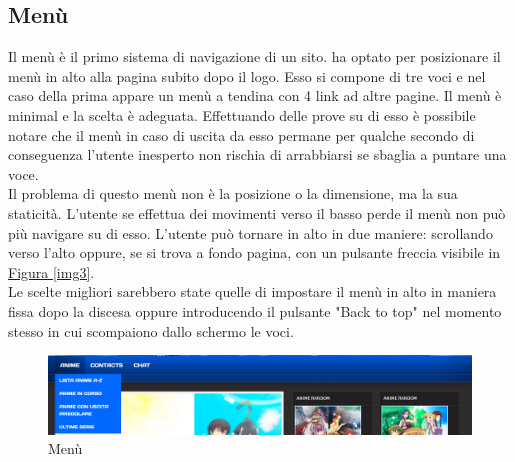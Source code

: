 \subsection{Menù} \label{Menù}
Il menù è il primo sistema di navigazione di un sito. \nomeSito ha optato per posizionare il menù in alto alla pagina subito dopo il logo. Esso si compone di tre voci e nel caso della prima appare un menù a tendina con 4 link ad altre pagine. Il menù è minimal e la scelta è adeguata. Effettuando delle prove su di esso è possibile notare che il menù in caso di uscita da esso permane per qualche secondo di conseguenza l'utente inesperto non rischia di arrabbiarsi se sbaglia a puntare una voce. \\
Il problema di questo menù non è la posizione o la dimensione, ma la sua staticità. L'utente se effettua dei movimenti verso il basso perde il menù non può più navigare su di esso. L'utente può tornare in alto in due maniere: scrollando verso l'alto oppure, se si trova a fondo pagina, con un pulsante freccia visibile in \hyperref[img3]{Figura \ref{img3}}.\\
Le scelte migliori sarebbero state quelle di impostare il menù in alto in maniera fissa dopo la discesa oppure introducendo il pulsante "Back to top" nel momento stesso in cui scompaiono dallo schermo le voci.

\begin{figure}[H]
	\includegraphics[width=1\textwidth]{img/menu.png}
	\caption{Menù} 
	\label{img4} 
\end{figure}